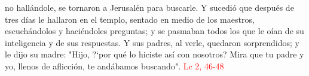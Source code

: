  no hallándole, se tornaron a Jerusalén para buscarle. Y sucedió que después de tres días le hallaron en el templo,
sentado en medio de los maestros, escuchándolos y haciéndoles preguntas; y se pasmaban todos los que le oían de su inteligencia y de sus respuestas.
Y sus padres, al verle, quedaron sorprendidos; y le dijo su madre: "Hijo, {?`}por qué lo hiciste así con nosotros? Mira que tu padre y yo, llenos de aflicción, 
te andábamos buscando". \textcolor{red}{Lc 2, 46-48}